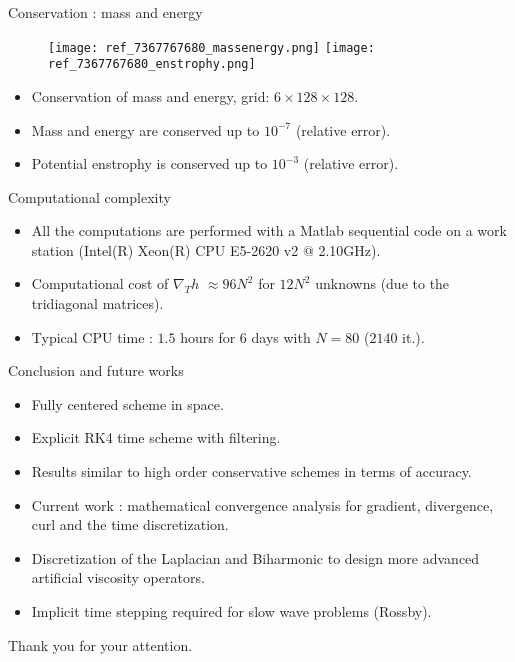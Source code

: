 \documentclass[11pt]{beamer}
\begin{document}
\begin{frame}{Conservation : mass and energy}
\begin{figure}
\texttt{[image: ref\_7367767680\_massenergy.png]}
\texttt{[image: ref\_7367767680\_enstrophy.png]}
\end{figure}
\begin{itemize}
\item Conservation of mass and energy, grid: $6 \times 128 \times 128$.
\item Mass and energy are conserved up to $10^{-7}$ (relative error).
\item Potential enstrophy is conserved up to $10^{-3}$ (relative error).
\end{itemize}
\end{frame}


\begin{frame}{Computational complexity}
\begin{itemize}
\item All the computations are performed with a Matlab sequential code on a work station (Intel(R) Xeon(R) CPU E5-2620 v2 @ 2.10GHz).
\item Computational cost of $\nabla_T h$ $\approx 96N^2$ for $12N^2$ unknowns (due to the tridiagonal matrices).
\item Typical CPU time : $1.5$ hours for $6$ days with $N=80$ ($2140$ it.).
\end{itemize}
\end{frame}


\begin{frame}{Conclusion and future works}
\begin{itemize}
\item Fully centered scheme in space.
\item Explicit RK4 time scheme with filtering.
\item Results similar to high order conservative schemes in terms of accuracy.
\item Current work : mathematical convergence analysis for gradient, divergence, curl and the time discretization.
\item Discretization of the Laplacian and Biharmonic to design more advanced artificial viscosity operators.
\item Implicit time stepping required for slow wave problems (Rossby).
\end{itemize}
\end{frame}


\begin{frame}
\begin{center}
Thank you for your attention.
\end{center}
\end{frame}
\end{document}
